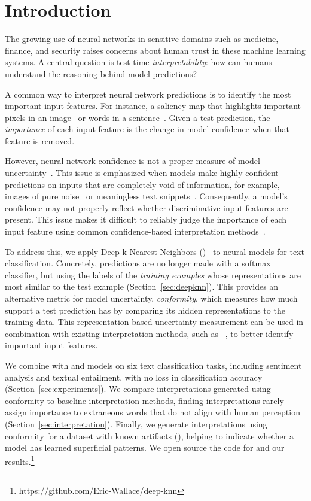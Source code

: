 \section{Introduction}
\label{sec:introduction}

The growing use of neural networks in sensitive domains such as
medicine, finance, and security raises concerns about human
trust in these machine learning systems. A central question is
test-time \emph{interpretability}: how can humans understand the
reasoning behind model predictions?

A common way to interpret neural network predictions is to identify the
most important input features. For
instance, a saliency map that highlights important pixels in an
image~\cite{sundararajan2017axiomatic} or words in a
sentence~\cite{li2016understanding}. Given a test prediction,
the \emph{importance} of each input feature is the change in model confidence when that
feature is removed.

However, neural network confidence is not a proper measure
of model uncertainty~\cite{guo2017calibration}. This issue is emphasized
when models make highly confident predictions on inputs that
are completely void of information, for example, images of pure
noise~\cite{goodfellow2014explaining} or meaningless text
snippets~\cite{feng2018rawr}. Consequently, a model's
confidence may not properly reflect whether discriminative
input features are present. This issue makes it difficult 
to reliably judge the importance of each input feature using common
confidence-based interpretation methods~\cite{feng2018rawr}.

To address this, we apply Deep k-Nearest Neighbors
(\dknn{})~\cite{papernot2018dknn} to neural models for text
classification. Concretely, predictions are no longer
made with a softmax classifier, but using
the labels of the \emph{training examples} whose representations are
most similar to the test example (Section~\ref{sec:deepknn}).
This provides an alternative metric for
model uncertainty, \emph{conformity}, which measures how much
support a test prediction has by comparing its hidden representations
to the training data. This representation-based uncertainty
measurement can be used in combination with existing 
interpretation methods, such as \loo{}~\cite{li2016understanding}, to better identify important
input features.

We combine \dknn{} with \cnn{} and \lstm{} models on six
 text classification tasks, including sentiment analysis and textual entailment, with no loss
in classification accuracy (Section~\ref{sec:experiments}). We compare interpretations generated using \dknn{}
conformity to baseline interpretation methods, finding \dknn{} interpretations rarely assign
importance to extraneous words that do not align with human perception (Section~\ref{sec:interpretation}).
Finally, we generate interpretations using \dknn{} conformity for a dataset with known artifacts (),
helping to indicate whether a model has learned superficial patterns.
We open source the code for \dknn{} and our results.\footnote{https://github.com/Eric-Wallace/deep-knn}
